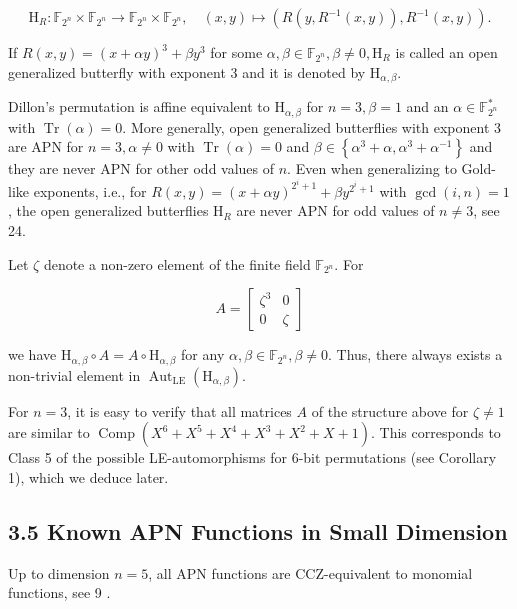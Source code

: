 \documentclass[10pt]{article}
\begin{document}
$$
\mathrm{H}_{R}: \mathbb{F}_{2^{n}} \times \mathbb{F}_{2^{n}} \rightarrow \mathbb{F}_{2^{n}} \times \mathbb{F}_{2^{n}}, \quad(x, y) \mapsto\left(R\left(y, R^{-1}(x, y)\right), R^{-1}(x, y)\right) .
$$

If $R(x, y)=(x+\alpha y)^{3}+\beta y^{3}$ for some $\alpha, \beta \in \mathbb{F}_{2^{n}}, \beta \neq 0, \mathrm{H}_{R}$ is called an open generalized butterfly with exponent 3 and it is denoted by $\mathrm{H}_{\alpha, \beta}$.

Dillon's permutation is affine equivalent to $\mathrm{H}_{\alpha, \beta}$ for $n=3, \beta=1$ and an $\alpha \in \mathbb{F}_{2^{n}}^{*}$ with $\operatorname{Tr}(\alpha)=0$. More generally, open generalized butterflies with exponent 3 are APN for $n=3, \alpha \neq 0$ with $\operatorname{Tr}(\alpha)=0$ and $\beta \in\left\{\alpha^{3}+\alpha, \alpha^{3}+\alpha^{-1}\right\}$ and they are never APN for other odd values of $n$. Even when generalizing to Gold-like exponents, i.e., for $R(x, y)=(x+\alpha y)^{2^{i}+1}+\beta y^{2^{i}+1}$ with $\operatorname{gcd}(i, n)=1$, the open generalized butterflies $\mathrm{H}_{R}$ are never APN for odd values of $n \neq 3$, see 24.

Let $\zeta$ denote a non-zero element of the finite field $\mathbb{F}_{2^{n}}$. For

$$
A=\left[\begin{array}{ll}
\zeta^{3} & 0 \\
0 & \zeta
\end{array}\right]
$$

we have $\mathrm{H}_{\alpha, \beta} \circ A=A \circ \mathrm{H}_{\alpha, \beta}$ for any $\alpha, \beta \in \mathbb{F}_{2^{n}}, \beta \neq 0$. Thus, there always exists a non-trivial element in $\operatorname{Aut}_{\mathrm{LE}}\left(\mathrm{H}_{\alpha, \beta}\right)$.

For $n=3$, it is easy to verify that all matrices $A$ of the structure above for $\zeta \neq 1$ are similar to $\operatorname{Comp}\left(X^{6}+X^{5}+X^{4}+X^{3}+X^{2}+X+1\right)$. This corresponds to Class 5 of the possible LE-automorphisms for 6-bit permutations (see Corollary 1), which we deduce later.

\subsection*{3.5 Known APN Functions in Small Dimension}
Up to dimension $n=5$, all APN functions are CCZ-equivalent to monomial functions, see 9 .
\end{document}
